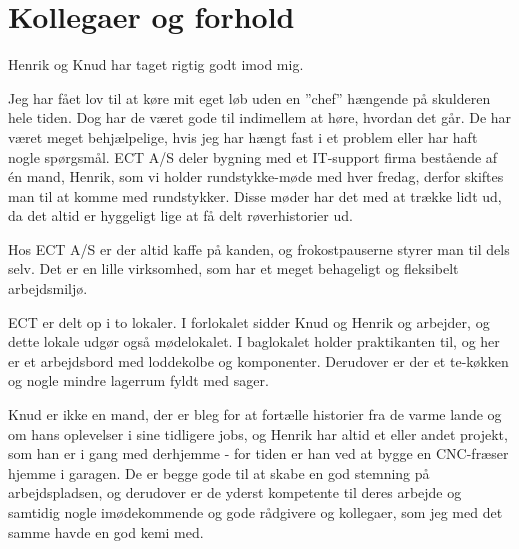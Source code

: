 \chapter{Kollegaer og forhold}

Henrik og Knud har taget rigtig godt imod mig. 

Jeg har fået lov til at køre mit eget løb uden en ''chef'' hængende på skulderen hele tiden. Dog har de været gode til indimellem at høre, hvordan det går. De har været meget behjælpelige, hvis jeg har hængt fast i et problem eller har haft nogle spørgsmål. ECT A/S deler bygning med et IT-support firma bestående af én mand, Henrik, som vi holder rundstykke-møde med hver fredag, derfor skiftes man til at komme med rundstykker. Disse møder har det med at trække lidt ud, da det altid er hyggeligt lige at få delt røverhistorier ud.

Hos ECT A/S er der altid kaffe på kanden, og frokostpauserne styrer man til dels selv. Det er en lille virksomhed, som har et meget behageligt og fleksibelt arbejdsmiljø.

ECT er delt op i to lokaler. I forlokalet sidder Knud og Henrik og arbejder, og dette lokale udgør også mødelokalet. I baglokalet holder praktikanten til, og her er et arbejdsbord med loddekolbe og komponenter. Derudover er der et te-køkken og nogle mindre lagerrum fyldt med sager.

Knud er ikke en mand, der er bleg for at fortælle historier fra de varme lande og om hans oplevelser i sine tidligere jobs, og Henrik har altid et eller andet projekt, som han er i gang med derhjemme - for tiden er han ved at bygge en CNC-fræser hjemme i garagen. De er begge gode til at skabe en god stemning på arbejdspladsen, og derudover er de yderst kompetente til deres arbejde og samtidig nogle imødekommende og gode rådgivere og kollegaer, som jeg med det samme havde en god kemi med.  